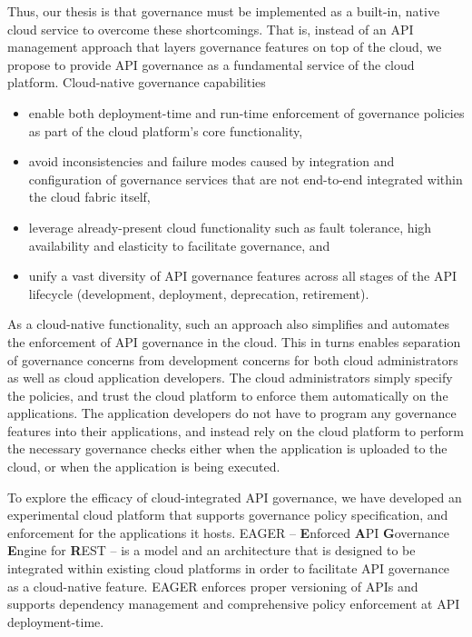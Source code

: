 Thus, our thesis is that governance must be implemented as a built-in, native
cloud service to overcome these shortcomings.
That is, instead of an API management
approach that layers governance features on top of the cloud, 
we propose to provide API governance as a fundamental service of the cloud
platform.  Cloud-native governance capabilities
\begin{itemize}
\item enable both deployment-time and run-time enforcement of governance
policies as part of the cloud platform's core functionality,
\item avoid inconsistencies and failure modes caused  
by integration and configuration of governance services that are not
end-to-end integrated within the cloud fabric itself, 
\item leverage already-present cloud functionality such as fault tolerance,
high availability and elasticity to facilitate governance, and
\item unify a vast diversity of API
governance features across all stages of the API lifecycle
(development, deployment, deprecation, retirement). 
\end{itemize}
As a cloud-native functionality, such an
approach also simplifies and automates the enforcement of API governance in the cloud.
This in turns enables separation of governance concerns from development concerns
for both cloud administrators as well as cloud application developers. The cloud
administrators simply specify the policies, and trust the cloud
platform to enforce them automatically on the applications. The application developers
do not have to program any governance features into their applications, and instead
rely on the cloud platform to perform the necessary governance checks either
when the application is uploaded to the cloud, or when the application is being 
executed.

To explore the efficacy of cloud-integrated API governance, we have developed
an experimental cloud platform that supports governance policy specification,
and enforcement for the applications it hosts. 
EAGER -- {\bf E}nforced {\bf A}PI {\bf G}overnance
{\bf E}ngine for {\bf R}EST -- is a model and an architecture that is designed
to be integrated within existing
cloud platforms in order to facilitate API governance as a 
cloud-native feature. EAGER enforces proper versioning of APIs and supports dependency 
management and comprehensive policy enforcement at API deployment-time. 

